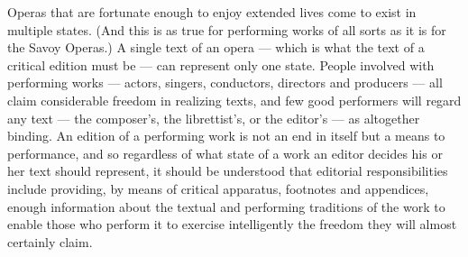 \begin{paper}
Operas that are fortunate enough to enjoy extended lives come to exist
in multiple states. (And this is as true for performing works of all
sorts as it is for the Savoy Operas.) A single text of an opera --- which
is what the text of a critical edition must be --- can represent only one
state. People involved with performing works --- actors, singers,
conductors, directors and producers --- all claim considerable freedom in
realizing texts, and few good performers will regard any text --- the
composer's, the librettist's, or the editor's --- as altogether binding.
An edition of a performing work is not an end in itself but a means to
performance, and so regardless of what state of a work an editor decides
his or her text should represent, it should be understood that editorial
responsibilities include providing, by means of critical apparatus,
footnotes and appendices, enough information about the textual and
performing traditions of the work to enable those who perform it to
exercise intelligently the freedom they will almost certainly claim.

\begin{flushleft}
  
\end{flushleft}
\end{paper}